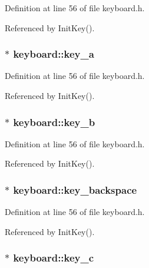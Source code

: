 Definition at line 56 of file keyboard.h.

Referenced by Init\-Key().
\subsubsection{$\ast$ {\bf keyboard::key\_\-a}\hspace{0.3cm}{\tt  [private]}}\label{classkeyboard_keyboardr0}




Definition at line 56 of file keyboard.h.

Referenced by Init\-Key().
\subsubsection{ $\ast$ {\bf keyboard::key\_\-b}\hspace{0.3cm}{\tt  [private]}}\label{classkeyboard_keyboardr1}




Definition at line 56 of file keyboard.h.

Referenced by Init\-Key().
\subsubsection{ $\ast$ {\bf keyboard::key\_\-backspace}\hspace{0.3cm}{\tt  [private]}}\label{classkeyboard_keyboardr40}




Definition at line 56 of file keyboard.h.

Referenced by Init\-Key().
\subsubsection{ $\ast$ {\bf keyboard::key\_\-c}\hspace{0.3cm}{\tt  [private]}}\label{classkeyboard_keyboardr2}




